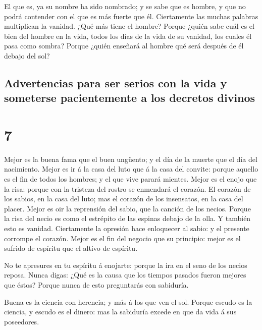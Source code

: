  El que es, ya su nombre ha sido nombrado; y se sabe que
es hombre, y que no podrá contender con el que es más fuerte que él.
 Ciertamente las muchas palabras multiplican la vanidad.
¿Qué más tiene el hombre?  Porque ¿quién sabe cuál es el
bien del hombre en la vida, todos los días de la vida de su vanidad, los
cuales él pasa como sombra? Porque ¿quién enseñará al hombre qué será
después de él debajo del sol?

\hypertarget{advertencias-para-ser-serios-con-la-vida-y-someterse-pacientemente-a-los-decretos-divinos}{%
\subsection{Advertencias para ser serios con la vida y someterse
pacientemente a los decretos
divinos}\label{advertencias-para-ser-serios-con-la-vida-y-someterse-pacientemente-a-los-decretos-divinos}}

\hypertarget{section-6}{%
\section{7}\label{section-6}}

 Mejor es la buena fama que el buen ungüento; y el día de
la muerte que el día del nacimiento.  Mejor es ir á la
casa del luto que á la casa del convite: porque aquello es el fin de
todos los hombres; y el que vive parará mientes.  Mejor es
el enojo que la risa: porque con la tristeza del rostro se enmendará el
corazón.  El corazón de los sabios, en la casa del luto;
mas el corazón de los insensatos, en la casa del placer. 
Mejor es oir la reprensión del sabio, que la canción de los necios.
 Porque la risa del necio es como el estrépito de las
espinas debajo de la olla. Y también esto es vanidad. 
Ciertamente la opresión hace enloquecer al sabio: y el presente corrompe
el corazón.  Mejor es el fin del negocio que su principio:
mejor es el sufrido de espíritu que el altivo de espíritu.

 No te apresures en tu espíritu á enojarte: porque la ira
en el seno de los necios reposa.  Nunca digas: ¿Qué es la
causa que los tiempos pasados fueron mejores que éstos? Porque nunca de
esto preguntarás con sabiduría.

 Buena es la ciencia con herencia; y más á los que ven el
sol.  Porque escudo es la ciencia, y escudo es el dinero:
mas la sabiduría excede en que da vida á sus poseedores.

